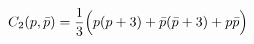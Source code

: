 \begin{equation}
C_2(p,\bar p)={1\over 3}\Bigr(p(p+3) + \bar p(\bar p+3) + p\bar p\Bigl)
\end{equation}

